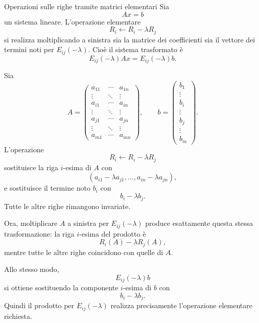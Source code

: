 \documentclass[a4paper]{article}
\begin{document}
\begin{snippetproposition}{Operazioni sulle righe tramite matrici elementari}
    Sia
    \[
        Ax=b
    \]
    un sistema lineare. L'operazione elementare
    \[
        R_i\leftarrow R_i-\lambda R_j
    \]
    si realizza moltiplicando a sinistra sia la matrice dei coefficienti sia il vettore dei termini noti per \(E_{ij}(-\lambda)\). Cioè il sistema trasformato è
    \[
        E_{ij}(-\lambda)Ax=E_{ij}(-\lambda)b.
    \]
\end{snippetproposition}

\begin{snippetproof}{}
    Sia
    \[
        A=
        \begin{pmatrix}
            a_{11} & \cdots & a_{1n}\\
            \vdots & \ddots & \vdots\\
            a_{i1} & \cdots & a_{in}\\
            \vdots & \ddots & \vdots\\
            a_{j1} & \cdots & a_{jn}\\
            \vdots & \ddots & \vdots\\
            a_{m1} & \cdots & a_{mn}
        \end{pmatrix},
        \qquad
        b=
        \begin{pmatrix}
            b_1\\
            \vdots\\
            b_i\\
            \vdots\\
            b_j\\
            \vdots\\
            b_m
        \end{pmatrix}.
    \]
    L'operazione
    \[
        R_i\leftarrow R_i-\lambda R_j
    \]
    sostituisce la riga \(i\)-esima di \(A\) con
    \[
        (a_{i1}-\lambda a_{j1},\ldots,a_{in}-\lambda a_{jn}),
    \]
    e sostituisce il termine noto \(b_i\) con
    \[
        b_i-\lambda b_j.
    \]
    Tutte le altre righe rimangono invariate.

    Ora, moltiplicare \(A\) a sinistra per \(E_{ij}(-\lambda)\) produce esattamente questa stessa trasformazione: la riga \(i\)-esima del prodotto è
    \[
        R_i(A)-\lambda R_j(A),
    \]
    mentre tutte le altre righe coincidono con quelle di \(A\).

    Allo stesso modo,
    \[
        E_{ij}(-\lambda)b
    \]
    si ottiene sostituendo la componente \(i\)-esima di \(b\) con
    \[
        b_i-\lambda b_j.
    \]
    Quindi il prodotto per \(E_{ij}(-\lambda)\) realizza precisamente l'operazione elementare richiesta.
\end{snippetproof}
\end{document}
